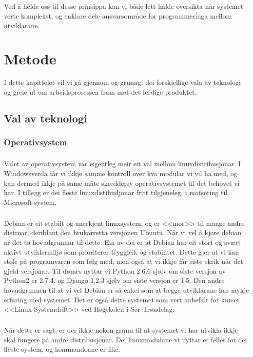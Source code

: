 \documentclass[nynorsk,12pt,a4paper,oneside]{book}
\begin{document}
\paragraph{}
Ved å helde oss til desse prinsippa kan vi både lett halde oversikta når systemet verte komplekst, og enklare dele ansvarsområde for programmeringa mellom utviklarane.

\chapter{Metode}
I dette kapittelet vil vi gå gjennom og grunngi dei forskjellige vala av teknologi og greie ut om arbeidsprosessen fram mot det ferdige produktet. 
 
\section{Val av teknologi}
\subsection{Operativsystem}
\paragraph{}
Valet av operativsystem var eigentleg meir eit val mellom linuxdistribusjonar. I Windowsverda får vi ikkje samme kontroll over kva modular vi vil ha med, og kan dermed ikkje på same måte skreddersy operativsystemet til det behovet vi har. I tillegg er dei fleste linuxdistibudjonar fritt tilgjeneleg, i motseting til Microsoft-system. 
\paragraph{}
Debian er eit stabilt og anerkjent linuxsystem, og er <<mor>> til mange andre distroar, deriblant den brukarretta versjonen Ubuntu. Når vi vel å kjøre debian ar det to hovudgrunnar til dette. Ein av dei er at Debian har eit stort og svært aktivt utviklermiljø som prioriterer tryggleik og stabilitet. Dette gjer at vi kan stole på programvaren som følg med, men også at vi ikkje får siste skrik når det gjeld versjonar. Til dømes nyttar vi Python 2.6.6 sjølv om siste versjon av Python2 er 2.7.4, og Django 1.2.3 sjølv om siste versjon er 1.5. 
Den andre hovudgrunnen til at vi vel Debian er så enkel som at begge utviklarane har mykje erfaring med systemet. Det er også dette systemet som vert anbefalt for kurset <<Linux Systemdrift>> ved Høgskolen i Sør-Trøndelag.
\paragraph{}
Når dette er sagt, er der ikkje nokon grunn til at systemet vi har utvikla ikkje skal fungere på andre distribusjonar. Dei linuxmodulane vi nyttar er felles for dei fleste system, og kommandoane er like.  
\end{document}
